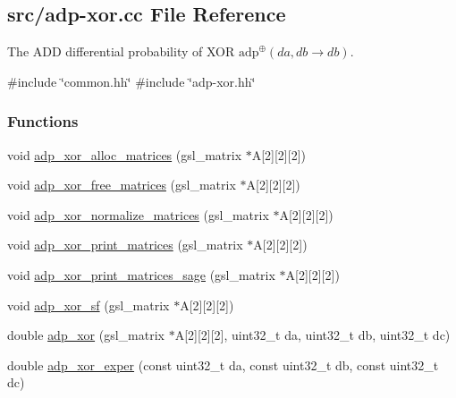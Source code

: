 \hypertarget{adp-xor_8cc}{\subsection{src/adp-\/xor.cc \-File \-Reference}
\label{adp-xor_8cc}
}


\-The \-A\-D\-D differential probability of \-X\-O\-R $\mathrm{adp}^{\oplus}(da,db \rightarrow db)$.  


{\ttfamily \#include \char`\"{}common.\-hh\char`\"{}}\*
{\ttfamily \#include \char`\"{}adp-\/xor.\-hh\char`\"{}}\*
\subsubsection*{\-Functions}
\begin{DoxyCompactItemize}
\item 
void \hyperlink{adp-xor_8cc_a23d0b0f04de73d2272f94a2f4bf4d268}{adp\-\_\-xor\-\_\-alloc\-\_\-matrices} (gsl\-\_\-matrix $\ast$\-A\mbox{[}2\mbox{]}\mbox{[}2\mbox{]}\mbox{[}2\mbox{]})
\item 
void \hyperlink{adp-xor_8cc_a4a822cd164af30e0fa8bfe3eadb9dbde}{adp\-\_\-xor\-\_\-free\-\_\-matrices} (gsl\-\_\-matrix $\ast$\-A\mbox{[}2\mbox{]}\mbox{[}2\mbox{]}\mbox{[}2\mbox{]})
\item 
void \hyperlink{adp-xor_8cc_a4c50572f657100b1e5d33a433c148a86}{adp\-\_\-xor\-\_\-normalize\-\_\-matrices} (gsl\-\_\-matrix $\ast$\-A\mbox{[}2\mbox{]}\mbox{[}2\mbox{]}\mbox{[}2\mbox{]})
\item 
void \hyperlink{adp-xor_8cc_a90322676fddee1876f0cd42e53e294e5}{adp\-\_\-xor\-\_\-print\-\_\-matrices} (gsl\-\_\-matrix $\ast$\-A\mbox{[}2\mbox{]}\mbox{[}2\mbox{]}\mbox{[}2\mbox{]})
\item 
void \hyperlink{adp-xor_8cc_a279df9bc30e67dd7cf27e1b926cbd9c2}{adp\-\_\-xor\-\_\-print\-\_\-matrices\-\_\-sage} (gsl\-\_\-matrix $\ast$\-A\mbox{[}2\mbox{]}\mbox{[}2\mbox{]}\mbox{[}2\mbox{]})
\item 
void \hyperlink{adp-xor_8cc_a42dda78d01cbb1a68263d971c1ab63ea}{adp\-\_\-xor\-\_\-sf} (gsl\-\_\-matrix $\ast$\-A\mbox{[}2\mbox{]}\mbox{[}2\mbox{]}\mbox{[}2\mbox{]})
\item 
double \hyperlink{adp-xor_8cc_ac720722a292fc8bb277b751e0b0be072}{adp\-\_\-xor} (gsl\-\_\-matrix $\ast$\-A\mbox{[}2\mbox{]}\mbox{[}2\mbox{]}\mbox{[}2\mbox{]}, uint32\-\_\-t da, uint32\-\_\-t db, uint32\-\_\-t dc)
\item 
double \hyperlink{adp-xor_8cc_ae0ed5c441b6eae025518787a1e2ff7a1}{adp\-\_\-xor\-\_\-exper} (const uint32\-\_\-t da, const uint32\-\_\-t db, const uint32\-\_\-t dc)
\end{DoxyCompactItemize}


